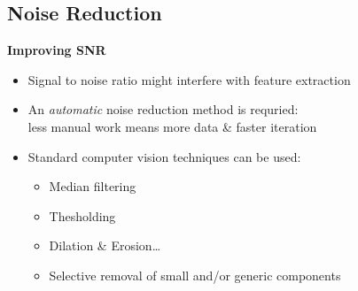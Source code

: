 \documentclass[t, xcolor={dvipsnames}]{beamer}
\begin{document}


\subsection{Noise Reduction}

\begin{frame}[fragile]
  \vspace{0.5cm}
  {\bfseries\Large Improving SNR}\\
  \vspace{0.5cm}
  \begin{addmargin}{0.5cm}
    \begin{itemize}
      \item Signal to noise ratio might interfere with feature extraction
      \item An \emph{automatic} noise reduction method is requried: \\
        less manual work means more data \& faster iteration
      \item Standard computer vision techniques can be used:
      \begin{itemize}
        \item Median filtering
        \item Thesholding
        \item Dilation \& Erosion\ldots
        \item Selective removal of small and/or generic components
      \end{itemize}
    \end{itemize}
  \end{addmargin}
\end{frame}

%
%
%
%
%
%
\end{document}
